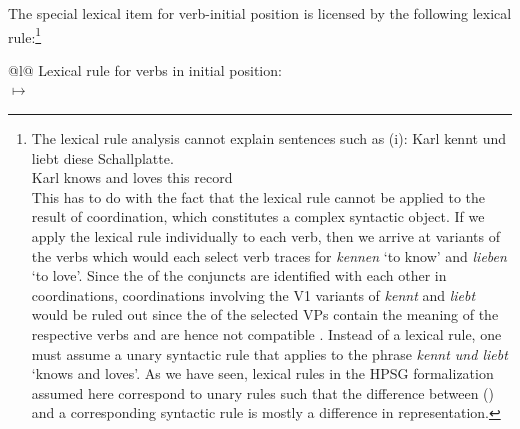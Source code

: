 The special lexical item for verb-initial position is licensed by the following lexical rule:\footnote{%
	The lexical rule analysis cannot explain sentences such as (i):
\ea
\gll Karl kennt und liebt diese Schallplatte.\\
	 Karl knows and loves this record\\
\z
This has to do with the fact that the lexical rule cannot be applied to the result of coordination, which constitutes a complex syntactic object.
If we apply the lexical rule individually to each verb, then we arrive at variants of the verbs which would each select verb traces for 
\emph{kennen} `to know' and \emph{lieben} `to love'. Since the \catvs of the conjuncts are identified with
each other in coordinations, coordinations involving the V1 variants of  \emph{kennt} and
\emph{liebt} would be ruled out since the \dslvs of the selected VPs contain the meaning of
the respective verbs and are hence not compatible \citep[]{Mueller2005c}. Instead of a lexical rule, one must assume a unary syntactic rule that applies to the phrase \emph{kennt und liebt} `knows and loves'.
As we have seen, lexical rules in the HPSG formalization assumed here correspond to unary rules such that the difference between 
() and a corresponding syntactic rule is mostly a difference in representation.
}
\eas
\label{lr-verb-movement}
\begin{tabular}[t]{@{}l@{}}
Lexical rule for verbs in initial position:\\
 $\mapsto$\\
\hfill{}
\end{tabular}
\zs

